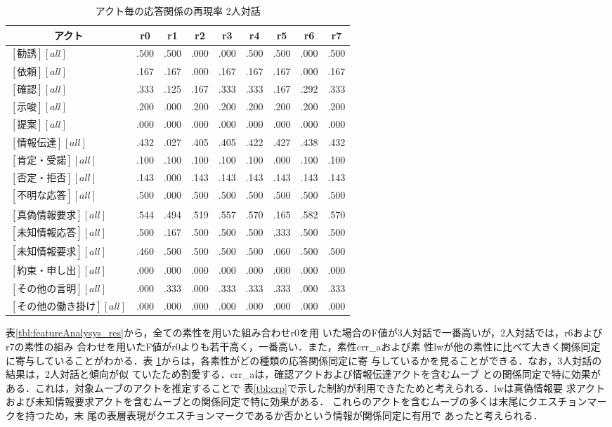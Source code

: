 \begin{table}[tbt]
\small
  \begin{center}
    \caption{アクト毎の応答関係の再現率 2人対話}
    \label{tbl:res-featureByType-2}
    \begin{tabular}{|l|cccccccc|}
      \hline
       \multicolumn{1}{|c|}{アクト} & r0 & r1 & r2 & r3 & r4 & r5 & r6 & r7 \\
      \hline
	  $[勧誘][all]$			&.500&.500&.000&.000&.500&.500&.000&.500 \\
	  $[依頼][all]$			&.167&.167&.000&.167&.167&.167&.000&.167 \\
	  $[確認][all]$			&.333&.125&.167&.333&.333&.167&.292&.333 \\
	  $[示唆][all]$			&.200&.000&.200&.200&.200&.200&.200&.200 \\
	  $[提案][all]$			&.000&.000&.000&.000&.000&.000&.000&.000 \\
	  $[情報伝達][all]$		&.432&.027&.405&.405&.422&.427&.438&.432 \\
	  $[肯定・受諾][all]$		&.100&.100&.100&.100&.100&.000&.100&.100 \\
	  $[否定・拒否][all]$		&.143&.000&.143&.143&.143&.143&.143&.143 \\
	  $[不明な応答][all]$		&.500&.000&.500&.500&.500&.500&.500&.500 \\
	  $[真偽情報要求][all]$		&.544&.494&.519&.557&.570&.165&.582&.570 \\
	  $[未知情報応答][all]$		&.500&.167&.500&.500&.500&.333&.500&.500 \\
	  $[未知情報要求][all]$		&.460&.500&.500&.500&.500&.060&.500&.500 \\
	  $[約束・申し出][all]$		&.000&.000&.000&.000&.000&.000&.000&.000 \\
	  $[その他の言明][all]$		&.000&.333&.000&.333&.333&.333&.000&.333 \\
	  $[その他の働き掛け][all]$	&.000&.000&.000&.000&.000&.000&.000&.000 \\
      \hline
    \end{tabular}
  \end{center}
\end{table}

表\ref{tbl:featureAnalysys_res}から，全ての素性を用いた組み合わせr0を用
いた場合のF値が3人対話で一番高いが，2人対話では，r6およびr7の素性の組み
合わせを用いたF値がr0よりも若干高く，一番高い．また，素性crr\_aおよび素
性lwが他の素性に比べて大きく関係同定に寄与していることがわかる．表
\ref{tbl:res-featureByType-2}からは，各素性がどの種類の応答関係同定に寄
与しているかを見ることができる．なお，3人対話の結果は，2人対話と傾向が似
ていたため割愛する．crr\_aは，確認アクトおよび情報伝達アクトを含むムーブ
との関係同定で特に効果がある．これは，対象ムーブのアクトを推定することで
表\ref{tbl:crp}で示した制約が利用できたためと考えられる．lwは真偽情報要
求アクトおよび未知情報要求アクトを含むムーブとの関係同定で特に効果がある．
これらのアクトを含むムーブの多くは末尾にクエスチョンマークを持つため，末
尾の表層表現がクエスチョンマークであるか否かという情報が関係同定に有用で
あったと考えられる．
